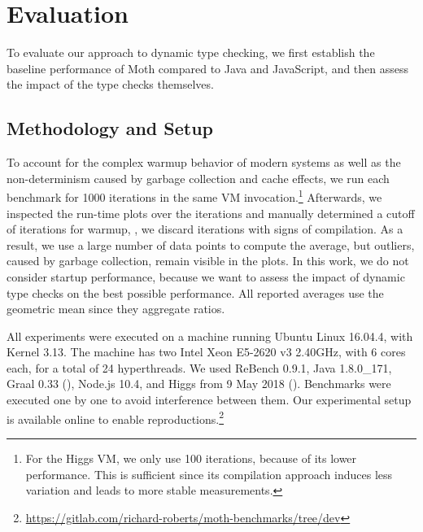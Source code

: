 
\section{Evaluation}
\label{sec:evaluation}

\newcommand{\NumIterationsAll}{1000\xspace}
\newcommand{\NumIterationsHiggs}{100\xspace}


To evaluate our approach to dynamic type checking,
we first establish the baseline performance of Moth
compared to Java and JavaScript,
and then assess the impact of the type checks themselves.

\subsection{Methodology and Setup}

To account for the complex warmup behavior
of modern systems\citep{Barrett:2017:VMW} as well as
the non-determinism caused by \eg garbage collection and cache effects,
we run each benchmark for \NumIterationsAll iterations in the same
VM invocation.\footnote{
For the Higgs VM, we only use \NumIterationsHiggs iterations,
because of its lower performance.
This is sufficient since its compilation approach induces less variation
and leads to more stable measurements.}
Afterwards, we inspected the run-time plots over the iterations
and manually determined a cutoff of \WarmupCutOff iterations for warmup,
\ie, we discard iterations with signs of compilation.
As a result, we use a large number of data points to compute the average,
but outliers, caused by \eg garbage collection, remain visible in the plots.
In this work, we do not consider startup performance,
because we want to assess the impact of dynamic type checks
on the best possible performance.
All reported averages use the geometric mean since they aggregate ratios.

All experiments were executed on a machine running Ubuntu Linux 16.04.4,
with Kernel 3.13.
The machine has two Intel Xeon E5-2620 v3 2.40GHz,
with 6 cores each, for a total of 24 hyperthreads.
We used ReBench 0.9.1, Java 1.8.0\_171, Graal 0.33 (),
Node.js 10.4, and Higgs from 9 May 2018 ().
Benchmarks were executed one by one to avoid interference between them.
Our experimental setup is available online to enable reproductions.\footnote{
\url{https://gitlab.com/richard-roberts/moth-benchmarks/tree/dev}}


